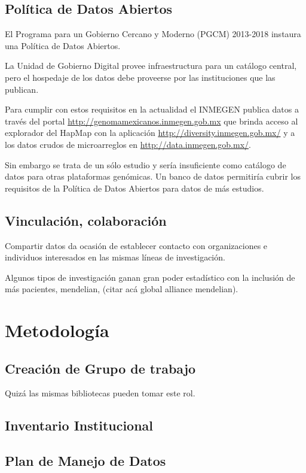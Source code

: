 \documentclass[
10pt, %
letterpaper, %
oneside, %
headinclude,footinclude, %
BCOR5mm, %
]{scrartcl}
\begin{document}
\subsection{Política de Datos Abiertos}
El Programa para un Gobierno Cercano y Moderno (PGCM) 2013-2018
instaura una Política de Datos Abiertos.

La Unidad de Gobierno Digital provee infraestructura para un catálogo
central, pero el hospedaje de los datos debe proveerse por las
instituciones que las publican.

Para cumplir con estos requisitos en la actualidad el INMEGEN publica
datos a través del portal \url{http://genomamexicanos.inmegen.gob.mx} que
brinda acceso al explorador del HapMap con la aplicación
\url{http://diversity.inmegen.gob.mx/} y a los datos crudos de microarreglos
en \url{http://data.inmegen.gob.mx/}.

Sin embargo se trata de un sólo estudio y sería insuficiente como
catálogo de datos para otras plataformas genómicas. Un banco de datos
permitiría cubrir los requisitos de la Política de Datos Abiertos para
datos de más estudios.


\subsection{Vinculación, colaboración}
Compartir datos da ocasión de establecer contacto con organizaciones e
individuos interesados en las mismas líneas de investigación.

Algunos tipos de investigación ganan gran poder estadístico con la
inclusión de más pacientes, mendelian, (citar acá global alliance
mendelian). 


\section{Metodología}


\subsection{Creación de Grupo de trabajo}
Quizá las mismas bibliotecas pueden tomar este rol.

\subsection{Inventario Institucional}
\cite{_nih_????}

\subsection{Plan de Manejo de Datos}
\end{document}
